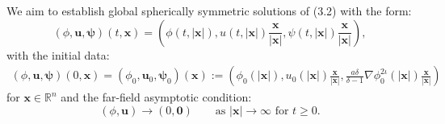 \documentclass[11pt,reqno]{amsart}
\numberwithin{rk}{section}
\numberwithin{prop}{section}
\numberwithin{mydef}{section}
\numberwithin{lem}{section}
\numberwithin{equation}{section}
\numberwithin{thm}{section}
\begin{document}
We aim to establish global spherically symmetric solutions of (3.2) with the form:
\begin{equation}\label{2.}
(\phi, \boldsymbol{u}, \boldsymbol{\psi})(t, \boldsymbol{x})=(\phi(t,|\boldsymbol{x}|), u(t,|\boldsymbol{x}|) \frac{\boldsymbol{x}}{|\boldsymbol{x}|}, \psi(t,|\boldsymbol{x}|) \frac{\boldsymbol{x}}{|\boldsymbol{x}|}),
\end{equation}
with the initial data:
\begin{equation}\label{sfana1}
\begin{aligned}
(\phi, \boldsymbol{u}, \boldsymbol{\psi})(0, \boldsymbol{x}) =\left(\phi_0, \boldsymbol{u}_0, \boldsymbol{\psi}_0\right)(\boldsymbol{x}) :=(\phi_0(|\boldsymbol{x}|), u_0(|\boldsymbol{x}|) \frac{\boldsymbol{x}}{|\boldsymbol{x}|}, \frac{a\delta}{\delta-1}\nabla\phi_0^{2\iota}(|\boldsymbol{x}|) \frac{\boldsymbol{x}}{|\boldsymbol{x}|})  
\end{aligned}
\end{equation}
for $\boldsymbol{x} \in \mathbb{R}^n$ and the far-field asymptotic condition:
\begin{equation}\label{sfanb1}
(\phi, \boldsymbol{u})\to (0,\boldsymbol{0})\qquad \text{as $|\boldsymbol{x}|\to \infty$ \ for $t \geq 0$}.
\end{equation}
\end{document}
